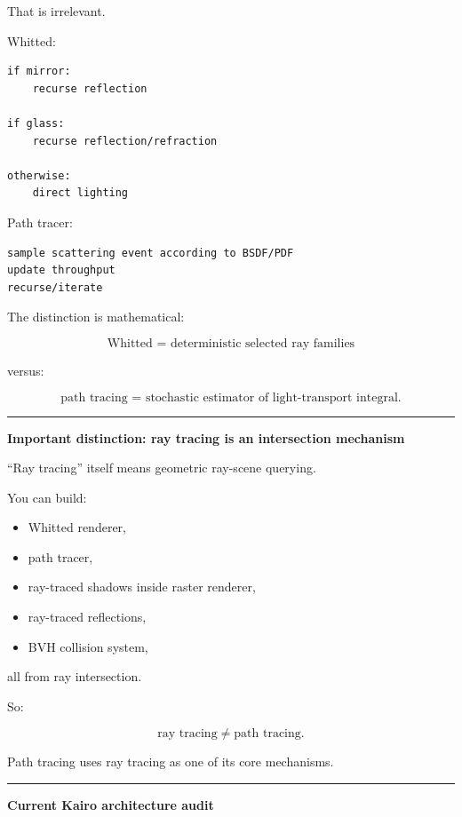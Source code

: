 That is irrelevant.

Whitted:

\begin{verbatim}
if mirror:
    recurse reflection

if glass:
    recurse reflection/refraction

otherwise:
    direct lighting
\end{verbatim}

Path tracer:

\begin{verbatim}
sample scattering event according to BSDF/PDF
update throughput
recurse/iterate
\end{verbatim}

The distinction is mathematical:

\[
\boxed{
\text{Whitted = deterministic selected ray families}
}
\]

versus:

\[
\boxed{
\text{path tracing = stochastic estimator of light-transport integral}.
}
\]

\begin{center}\rule{0.5\linewidth}{0.5pt}\end{center}

\textbf{Important distinction: ray tracing is an intersection mechanism}

``Ray tracing'' itself means geometric ray-scene querying.

You can build:

\begin{itemize}
\tightlist
\item
  Whitted renderer,
\item
  path tracer,
\item
  ray-traced shadows inside raster renderer,
\item
  ray-traced reflections,
\item
  BVH collision system,
\end{itemize}

all from ray intersection.

So:

\[
\boxed{
\text{ray tracing}
\neq
\text{path tracing}.
}
\]

Path tracing uses ray tracing as one of its core mechanisms.

\begin{center}\rule{0.5\linewidth}{0.5pt}\end{center}

\textbf{Current Kairo architecture audit}

